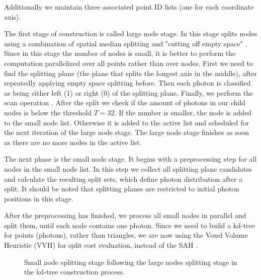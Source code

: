 Additionally we maintain three associated point ID lists (one for each coordinate axis).

The first stage of construction is called large node stage. In this stage splits nodes using a combination of spatial median splitting and "cutting off empty space" \cite{Havran2000:PhD}. Since in this stage the number of nodes is small, it is better to perform the computation parallelized over all points rather than over nodes. First we need to find the splitting plane (the plane that splits the longest axis in the middle), after repeatedly applying empty space splitting before. Then each photon is classified as being either left (1) or right (0) of the splitting plane. Finally, we perform the scan operation \cite{Mark2007}. After the split we check if the amount of photons in our child nodes is below the threshold \(T = 32\). If the number is smaller, the node is added to the small node list. Otherwise it is added to the active list and scheduled for the next iteration of the large node stage. The large node stage finishes as soon as there are no more nodes in the active list.

The next phase is the small node stage. It begins with a preprocessing step for all nodes in the small node list. In this step we collect all splitting plane candidates and calculate the resulting split sets, which define photon distribution after a split. It should be noted that splitting planes are restricted to initial photon positions in this stage.

After the preprocessing has finished, we process all small nodes in parallel and split them, until each node contains one photon. Since we need to build a kd-tree for points (photons), rather than triangles, we are now using the Voxel Volume Heuristic (VVH) \cite{wald:04:VVH} for split cost evaluation, instead of the SAH \cite{Havran2000:PhD}.

\begin{figure}[ftp]
    \centering
    \renewcommand{\thefigure}{\thechapter.\arabic{figure}}
    \caption[The Small Nodes splitting stage within kd-tree construction]{Small node splitting stage following the large nodes  splitting stage in the kd-tree construction process.}
    \label{fig:small_node_splitting}
\end{figure}


